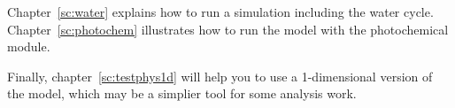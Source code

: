 Chapter~\ref{sc:water} explains how to run a simulation including the
water cycle.
Chapter~\ref{sc:photochem} illustrates how to run the model
with the photochemical module.

Finally, chapter~\ref{sc:testphys1d} will help you to use a 
1-dimensional version of the model,
which may be a simplier tool for some analysis work.





